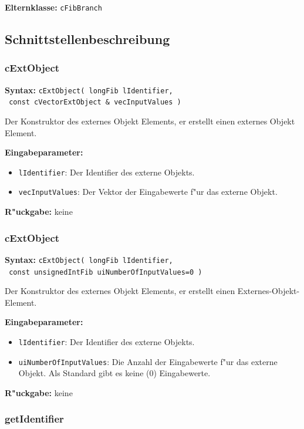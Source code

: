 \bigskip\noindent
\textbf{Elternklasse:} \verb|cFibBranch|


\subsection{Schnittstellenbeschreibung}

\subsubsection{cExtObject}

\textbf{Syntax:} \verb|cExtObject( longFib lIdentifier,| \\\verb| const cVectorExtObject & vecInputValues )|

\bigskip\noindent
Der Konstruktor des externes Objekt Elements, er erstellt einen externes Objekt Element.

\bigskip\noindent
\textbf{Eingabeparameter:}
\begin{itemize}
 \item \verb|lIdentifier|: Der Identifier des externe Objekts. 
 \item \verb|vecInputValues|: Der Vektor der Eingabewerte f"ur das externe Objekt.
\end{itemize}

\bigskip\noindent
\textbf{R"uckgabe:} keine


\subsubsection{cExtObject}

\textbf{Syntax:} \verb|cExtObject( longFib lIdentifier,| \\\verb| const unsignedIntFib uiNumberOfInputValues=0 )|

\bigskip\noindent
Der Konstruktor des externes Objekt Elements, er erstellt einen Externes-Objekt-Element.

\bigskip\noindent
\textbf{Eingabeparameter:}
\begin{itemize}
 \item \verb|lIdentifier|: Der Identifier des externe Objekts. 
 \item \verb|uiNumberOfInputValues|: Die Anzahl der Eingabewerte f"ur das externe Objekt. Als Standard gibt es keine ($0$) Eingabewerte.
\end{itemize}

\bigskip\noindent
\textbf{R"uckgabe:} keine


\subsubsection{getIdentifier}

